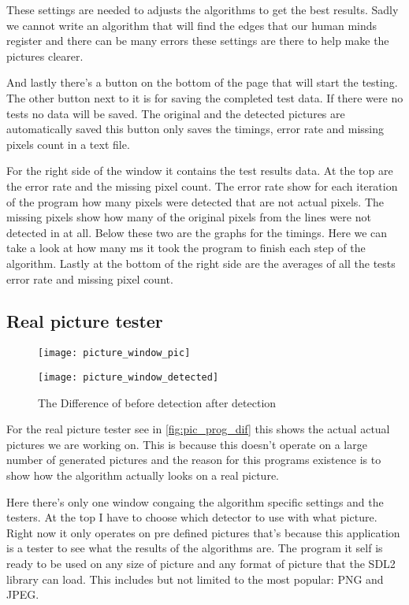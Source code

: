 These settings are needed to adjusts the algorithms to get the best results. Sadly we cannot write an algorithm that will find the edges that our human minds register and there can be many errors these settings are there to help make the pictures clearer.

And lastly there's a button on the bottom of the page that will start the testing. The other button next to it is for saving the completed test data. If there were no tests no data will be saved. The original and the detected pictures are automatically saved this button only saves the timings, error rate and missing pixels count in a text file.

For the right side of the window it contains the test results data. At the top are the error rate and the missing pixel count. The error rate show for each iteration of the program how many pixels were detected that are not actual pixels. The missing pixels show how many of the original pixels from the lines were not detected in at all. Below these two are the graphs for the timings. Here we can take a look at how many \ac{ms} it took the program to finish each step of the algorithm. Lastly at the bottom of the right side are the averages of all the tests error rate and missing pixel count.

\subsection{Real picture tester}
\label{chap:real_pic_tester}

\begin{figure}[H]
\centering
\begin{minipage}[t]{.49\textwidth}
\centering
\texttt{[image: picture\_window\_pic]}
\end{minipage}
\begin{minipage}[t]{.49\textwidth}
\centering
\texttt{[image: picture\_window\_detected]}
\end{minipage}
\caption{The Difference of before detection after detection}
\label{fig:pic_prog_dif}
\end{figure}

For the real picture tester see in \autoref{fig:pic_prog_dif} this shows the actual actual pictures we are working on. This is because this doesn't operate on a large number of generated pictures and the reason for this programs existence is to show how the algorithm actually looks on a real picture.

Here there's only one window congaing the algorithm specific settings and the testers. At the top I have to choose which detector to use with what picture. Right now it only operates on pre defined pictures that's because this application is a tester to see what the results of the algorithms are. The program it self is ready to be used on any size of picture and any format of picture that the \ac{SDL2} library can load. This includes but not limited to the most popular: \ac{PNG} and \ac{JPEG}.

